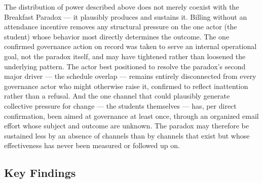 \documentclass[11pt]{article}
\begin{document}
The distribution of power described above does not merely coexist with the Breakfast
Paradox --- it plausibly produces and sustains it. Billing without an attendance
incentive removes any structural pressure on the one actor (the student) whose
behavior most directly determines the outcome. The one confirmed governance action on
record was taken to serve an internal operational goal, not the paradox itself, and
may have tightened rather than loosened the underlying pattern. The actor best
positioned to resolve the paradox's second major driver --- the schedule overlap ---
remains entirely disconnected from every governance actor who might otherwise raise
it, confirmed to reflect inattention rather than a refusal. And the one channel that
could plausibly generate collective pressure for change --- the students themselves
--- has, per direct confirmation, been aimed at governance at least once, through an
organized email effort whose subject and outcome are unknown. The paradox may
therefore be sustained less by an absence of channels than by channels that exist but
whose effectiveness has never been measured or followed up on.

\subsection{Key Findings}
\end{document}
